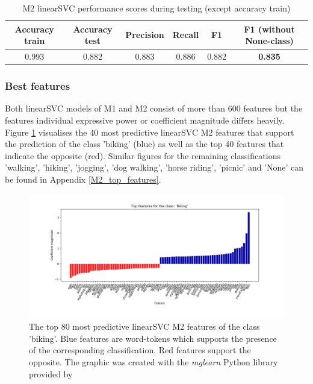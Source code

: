 \begin{table}[!htb] %
\begin{center}
\caption{M2 linearSVC performance scores during testing (except accuracy train)}\vspace{1ex}
\label{tab:m2_linearSVC_bestscores}
\begin{tabular}{cccccc}\hline
Accuracy train & Accuracy test & Precision & Recall & F1 & F1 (without None-class)\\ \hline
0.993 & 0.882 & 0.883 & 0.886 & 0.882 & \textbf{0.835} \\ \hline
\end{tabular}
\end{center}
\end{table}

\subsubsection{Best features}
Both linearSVC models of M1 and M2 consist of more than 600 features but the features individual expressive power or coefficient magnitude differs heavily. Figure \ref{fig:M2_top40_features_biking} visualises the 40 most predictive linearSVC M2 features that support the prediction of the class 'biking' (blue) as well as the top 40 features that indicate the opposite (red). Similar figures for the remaining classifications 'walking', 'hiking', 'jogging', 'dog walking', 'horse riding', 'picnic' and 'None' can be found in Appendix \ref{M2_top_features}.

\begin{figure}[!htb] %
   \centering
   \includegraphics[width=\textwidth]{img/m2_top_40_features_Biking_cropped.pdf}
   \caption{The top 80 most predictive linearSVC M2 features of the class 'biking'. Blue features are word-tokens which supports the presence of the corresponding classification. Red features support the opposite. The graphic was created with the \textit{mglearn} Python library provided by \textcite{Guido2016}}
   \label{fig:M2_top40_features_biking}
\end{figure}

